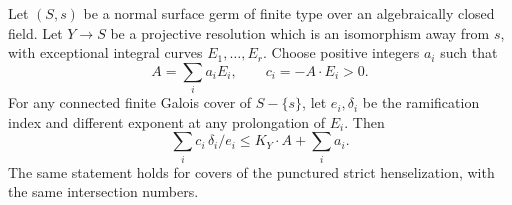 \begin{proposition}
\label{D:surface-uniform-different}
Let $(S,s)$ be a normal surface germ of finite type over an
algebraically closed field. Let $Y\to S$ be a projective
resolution which is an isomorphism away from $s$, with
exceptional integral curves $E_1,\ldots,E_r$.
Choose positive integers $a_i$ such that
\[
        A=\sum_i a_iE_i,\qquad c_i=-A\cdot E_i>0.           \tag{D.UB.5}
\]
For any connected finite Galois cover of $S-\{s\}$,
let $e_i,\delta_i$ be the ramification index and different
exponent at any prolongation of $E_i$. Then
\[
           \sum_i c_i\,\delta_i/e_i
                         \leq K_Y\cdot A+\sum_i a_i.       \tag{D.UB.6}
\]
The same statement holds for covers of the punctured
strict henselization, with the same intersection numbers.
\end{proposition}

